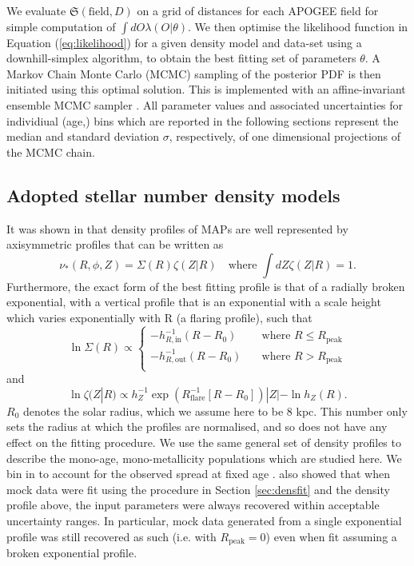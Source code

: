 We evaluate $\mathfrak{S}(\text{field}, D)$ on a grid of distances for each APOGEE field for simple computation of $\int dO \lambda(O|\theta)$. We then optimise the likelihood function in Equation (\ref{eq:likelihood}) for a given density model and data-set using a downhill-simplex algorithm, to obtain the best fitting set of parameters $\theta$. A Markov Chain Monte Carlo (MCMC) sampling of the posterior PDF is then initiated using this optimal solution. This is implemented with an affine-invariant ensemble MCMC sampler  \citep{goodmanweare2010,2013PASP..125..306F}. All parameter values and associated uncertainties for individiual (age,\feh{}) bins which are reported in the following sections represent the median and standard deviation $\sigma$, respectively, of one dimensional projections of the MCMC chain. 

\subsection{Adopted stellar number density models}
\label{sec:densitymodel}
It was shown in \citet{2016ApJ...823...30B} that density profiles of MAPs are well represented by axisymmetric profiles that can be written as 
\begin{equation}
\nu_*(R, \phi, Z) = \Sigma(R)\zeta(Z|R) \quad \text{where } \int dZ \zeta(Z|R) = 1.
\end{equation}
Furthermore, the exact form of the best fitting profile is that of a radially broken exponential, with a vertical profile that is an exponential with a scale height which varies exponentially with R (a flaring profile), such that
\begin{equation}
\ln \Sigma(R) \propto  \begin{cases}
    -h_{R,\text{in}}^{-1}(R-R_0)    & \quad \text{where } R \leq R_{\text{peak}}\\
   -h_{R,\text{out}}^{-1}(R-R_0)  &\quad \text{where } R > R_{\text{peak}}\\
  \end{cases}
\end{equation}
and
\begin{equation}
\ln \zeta(Z|R) \propto h_Z^{-1} \exp{(R_{\mathrm{flare}}^{-1}[R-R_0])} |Z|-\ln{h_Z(R)}.
\end{equation}
$R_0$ denotes the solar radius, which we assume here to be 8 kpc. This number only sets the radius at which the profiles are normalised, and so does not have any effect on the fitting procedure. We use the same general set of density profiles to describe the mono-age, mono-metallicity populations which are studied here. We bin in \feh{} to account for the observed \feh{} spread at fixed age \citep[e.g.][and our Figure \ref{fig:numbins}]{1993A&A...275..101E}. \citet{2016ApJ...823...30B} also showed that when mock data were fit using the procedure in Section \ref{sec:densfit} and the density profile above, the input parameters were always recovered within acceptable uncertainty ranges. In particular, mock data generated from a single exponential profile was still recovered as such (i.e. with $R_{\mathrm{peak}} = 0$) even when fit assuming a broken exponential profile.

